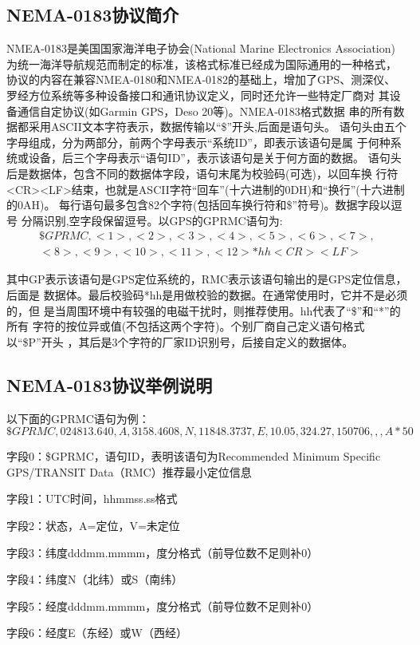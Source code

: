 \documentclass[UTF-8, a4paper, 12pt]{ctexart}
\begin{document}
\subsection{NEMA-0183协议简介}
NMEA-0183是美国国家海洋电子协会(National Marine Electronics Association)
为统一海洋导航规范而制定的标准，该格式标准已经成为国际通用的一种格式，
协议的内容在兼容NMEA-0180和NMEA-0182的基础上，增加了GPS、测深仪、
罗经方位系统等多种设备接口和通讯协议定义，同时还允许一些特定厂商对
其设备通信自定协议(如Garmin GPS，Deso 20等)。NMEA-0183格式数据
串的所有数据都采用ASCII文本字符表示，数据传输以“\$”开头,后面是语句头。
语句头由五个字母组成，分为两部分，前两个字母表示“系统ID”，即表示该语句是属
于何种系统或设备，后三个字母表示“语句ID”，表示该语句是关于何方面的数据。
语句头后是数据体，包含不同的数据体字段，语句末尾为校验码(可选)，以回车换
行符<CR><LF>结束，也就是ASCII字符“回车”(十六进制的0DH)和“换行”(十六进制的0AH)。
每行语句最多包含82个字符(包括回车换行符和\$”符号)。数据字段以逗号
分隔识别,空字段保留逗号。以GPS的GPRMC语句为:\bigskip
$$
\begin{array}{l}
    \$GPRMC,<1>,<2>,<3>,<4>,<5>,<6>,<7>,\\ <8>,<9>,<10>,<11>,<12>*hh<CR><LF>
\end{array}
$$

\bigskip
其中GP表示该语句是GPS定位系统的，RMC表示该语句输出的是GPS定位信息，后面是
数据体。最后校验码*hh是用做校验的数据。在通常使用时，它并不是必须的，但
是当周围环境中有较强的电磁干扰时，则推荐使用。hh代表了“\$”和“*”的所有
字符的按位异或值(不包括这两个字符)。个别厂商自己定义语句格式以“\$P”开头
，其后是3个字符的厂家ID识别号，后接自定义的数据体。

\subsection{NEMA-0183协议举例说明}
以下面的GPRMC语句为例：
$$
\$GPRMC,024813.640,A,3158.4608,N,11848.3737,E,10.05,324.27,150706,,,A*50
$$

字段0：\$GPRMC，语句ID，表明该语句为Recommended Minimum Specific GPS/TRANSIT Data（RMC）推荐最小定位信息

字段1：UTC时间，hhmmss.ss格式

字段2：状态，A=定位，V=未定位

字段3：纬度dddmm.mmmm，度分格式（前导位数不足则补0）

字段4：纬度N（北纬）或S（南纬）

字段5：经度dddmm.mmmm，度分格式（前导位数不足则补0）

字段6：经度E（东经）或W（西经）
\end{document}
